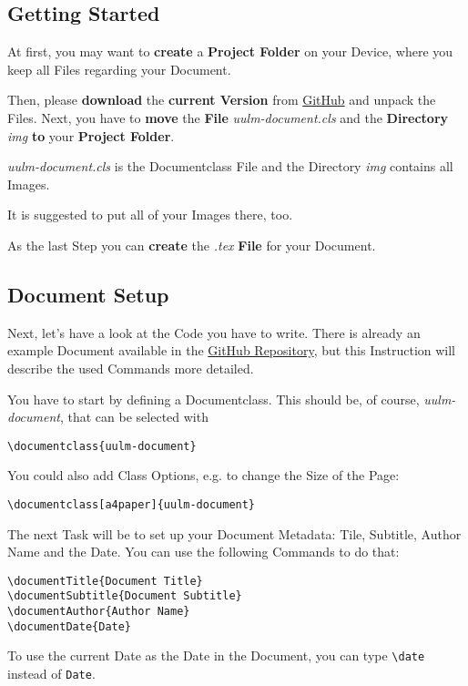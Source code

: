 \documentclass[a4paper]{../uulm-document}
\begin{document}
\subsection{Getting Started}
At first, you may want to \textbf{create} a \textbf{Project Folder} on your Device, where you keep all Files regarding your Document.

Then, please \textbf{download} the \textbf{current Version} from \href{https://github.com/JensOstertag/uulm-document}{GitHub} and unpack the Files. Next, you have to \textbf{move} the \textbf{File} \textit{uulm-document.cls} and the \textbf{Directory} \textit{img} \textbf{to} your \textbf{Project Folder}.

{\setlength\parindent{24pt} \color{gray}\textit{uulm-document.cls} is the Documentclass File and the Directory \textit{img} contains all Images.

It is suggested to put all of your Images there, too.}

As the last Step you can \textbf{create} the \textit{.tex} \textbf{File} for your Document.

\subsection{Document Setup}
Next, let's have a look at the Code you have to write. There is already an example Document available in the \href{https://github.com/JensOstertag/uulm-document}{GitHub Repository}, but this Instruction will describe the used Commands more detailed.

You have to start by defining a Documentclass. This should be, of course, \textit{uulm-document}, that can be selected with
\begin{lstlisting}
\documentclass{uulm-document}
\end{lstlisting}
You could also add Class Options, e.g. to change the Size of the Page:
\begin{lstlisting}
\documentclass[a4paper]{uulm-document}
\end{lstlisting}

The next Task will be to set up your Document Metadata: Tile, Subtitle, Author Name and the Date. You can use the following Commands to do that:
\begin{lstlisting}
\documentTitle{Document Title}
\documentSubtitle{Document Subtitle}
\documentAuthor{Author Name}
\documentDate{Date}
\end{lstlisting}
To use the current Date as the Date in the Document, you can type \lstinline!\date! instead of \lstinline!Date!.
\end{document}
